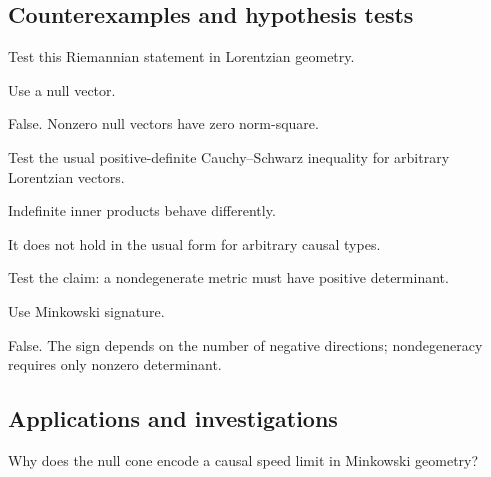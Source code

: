 \subsection*{Counterexamples and hypothesis tests}

\begin{exercise}\label{exr:vii29-ped-10}
Test this Riemannian statement in Lorentzian geometry.
\end{exercise}

\begin{hint}
Use a null vector.
\end{hint}

\begin{solution}
False.  Nonzero null vectors have zero norm-square.
\end{solution}

\begin{exercise}\label{exr:vii29-ped-11}
Test the usual positive-definite Cauchy--Schwarz inequality for arbitrary Lorentzian vectors.
\end{exercise}

\begin{hint}
Indefinite inner products behave differently.
\end{hint}

\begin{solution}
It does not hold in the usual form for arbitrary causal types.
\end{solution}

\begin{exercise}\label{exr:vii29-ped-12}
Test the claim: a nondegenerate metric must have positive determinant.
\end{exercise}

\begin{hint}
Use Minkowski signature.
\end{hint}

\begin{solution}
False.  The sign depends on the number of negative directions; nondegeneracy requires only nonzero determinant.
\end{solution}

\subsection*{Applications and investigations}

\begin{exercise}\label{exr:vii29-ped-13}
Why does the null cone encode a causal speed limit in Minkowski geometry?
\end{exercise}

